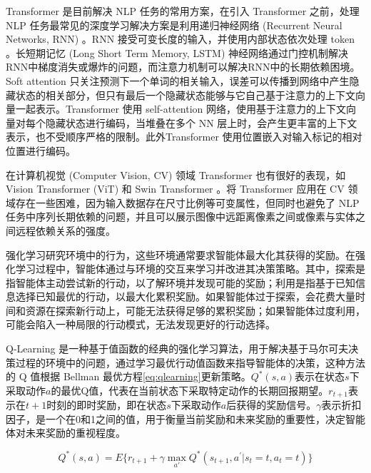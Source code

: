 \documentclass[final,1p,12pt,UTF8,review]{elsarticle}
\begin{document}
\par
Transformer 是目前解决 NLP 任务的常用方案，在引入 Transformer 之前，处理 NLP 任务最常见的深度学习解决方案是利用递归神经网络 (Recurrent Neural Networks, RNN) 。RNN 接受可变长度的输入，并使用内部状态依次处理 token 。长短期记忆 (Long Short Term Memory, LSTM) 神经网络通过门控机制解决RNN中梯度消失或爆炸的问题，而注意力机制可以解决RNN中的长期依赖困境。Soft attention 只关注预测下一个单词的相关输入，误差可以传播到网络中产生隐藏状态的相关部分，但只有最后一个隐藏状态能够与它自己基于注意力的上下文向量一起表示。Transformer 使用 self-attention 网络，使用基于注意力的上下文向量对每个隐藏状态进行编码，当堆叠在多个 NN 层上时，会产生更丰富的上下文表示，也不受顺序严格的限制。此外Transformer 使用位置嵌入对输入标记的相对位置进行编码。

\par
在计算机视觉 (Computer Vision, CV) 领域 Transformer 也有很好的表现，如Vision Transformer (ViT) 和 Swin Transformer 。将 Transformer 应用在 CV 领域存在一些困难，因为输入数据存在尺寸比例等可变属性，但同时也避免了 NLP 任务中序列长期依赖的问题，并且可以展示图像中远距离像素之间或像素与实体之间远程依赖关系的强度。

\par
强化学习研究环境中的行为，这些环境通常要求智能体最大化其获得的奖励。在强化学习过程中，智能体通过与环境的交互来学习并改进其决策策略。其中，探索是指智能体主动尝试新的行动，以了解环境并发现可能的奖励；利用是指基于已知信息选择已知最优的行动，以最大化累积奖励。如果智能体过于探索，会花费大量时间和资源在探索新行动上，可能无法获得足够的累积奖励；如果智能体过度利用，可能会陷入一种局限的行动模式，无法发现更好的行动选择。

\par
Q-Learning 是一种基于值函数的经典的强化学习算法，用于解决基于马尔可夫决策过程的环境中的问题，通过学习最优行动值函数来指导智能体的决策，这种方法的 Q 值根据 Bellman 最优方程\ref{eq:qlearning}更新策略。$Q^*(s,a)$表示在状态$s$下采取动作$a$的最优Q值，代表在当前状态下采取特定动作的长期回报期望。$r_{t+1}$表示在$t+1$时刻的即时奖励，即在状态$s$下采取动作$a$后获得的奖励信号。$\gamma$表示折扣因子，是一个在0和1之间的值，用于衡量当前奖励和未来奖励的重要性，决定智能体对未来奖励的重视程度。

\begin{figure}[htp]
    \begin{equation}
        \label{eq:qlearning}
        Q^*(s,a)=E\{r_{t+1}+\gamma \max_{a'}Q^*(s_{t+1},a^{'}| s_t=t, a_t=t)\}
    \end{equation}
\end{figure}
\end{document}
